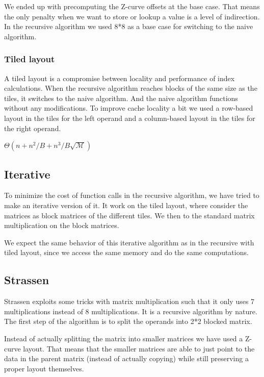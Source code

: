 We ended up with precomputing the Z-curve offsets at the base case. That means the only penalty when we want to store or lookup a value is a level of indirection. In the recursive algorithm we used 8*8 as a base case for switching to the naive algorithm.

\subsubsection{Tiled layout}

A tiled layout is a compromise between locality and performance of index calculations. When the recursive algorithm reaches blocks of the same size as the tiles, it switches to the naive algorithm. And the naive algorithm functions without any modifications. To improve cache locality a bit we used a row-based layout in the tiles for the left operand and a column-based layout in the tiles for the right operand.

$\Theta(n+n^2/B + n^3/B\sqrt{\mathcal{M}})$

\subsection{Iterative}
To minimize the cost of function calls in the recursive algorithm, we
have tried to make an iterative version of it. It work on the tiled
layout, where consider the matrices as block matrices of the different
tiles. We then to the standard matrix multiplication on the block
matrices.

We expect the same behavior of this iterative algorithm as in the
recursive with tiled layout, since we access the same memory and do
the same computations.

\subsection{Strassen}

Strassen exploits some tricks with matrix multiplication such that it only uses 7 multiplications instead of 8 multiplications. It is a recursive algorithm by nature. The first step of the algorithm is to split the operands into 2*2 blocked matrix.

Instead of actually splitting the matrix into smaller matrices we have used a Z-curve layout. That means that the smaller matrices are able to just point to the data in the parent matrix (instead of actually copying) while still preserving a proper layout themselves.

